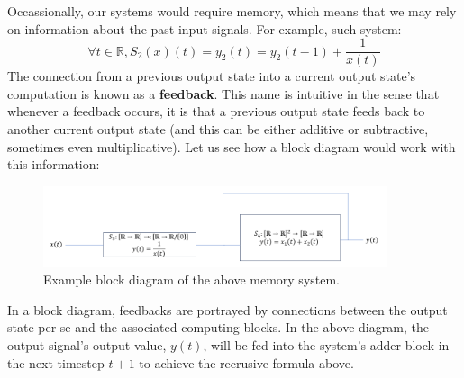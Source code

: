 Occassionally, our systems would require memory, which means that we may rely on information about the past input signals.
For example, such system:
\[
    \forall t \in \mathbb{R}, S_2(x)(t) = y_2(t) = y_2(t - 1) + \frac{1}{x(t)}
\]
The connection from a previous output state into a current output state's computation is known as a \textbf{feedback}.
This name is intuitive in the sense that whenever a feedback occurs, it is that a previous output state feeds back to another current output state (and this can be either additive or subtractive, sometimes even multiplicative).
Let us see how a block diagram would work with this information:
\begin{center}
    \begin{figure}[h]
        \centering
        \includegraphics[width=0.9\textwidth]{figs/ln06/example_feedback_block.png}
        \caption{Example block diagram of the above memory system.}
    \end{figure}
\end{center}

In a block diagram, feedbacks are portrayed by connections between the output state per se and the associated computing blocks.
In the above diagram, the output signal's output value, $y(t)$, will be fed into the system's adder block in the next timestep $t+1$ to achieve the recrusive formula above.

